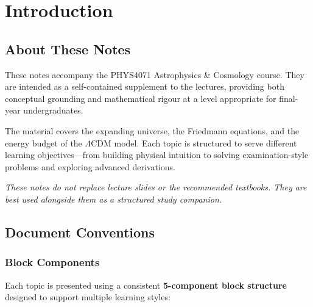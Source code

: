 
\chapter*{Introduction}


\section*{About These Notes}

These notes accompany the PHYS4071 Astrophysics \& Cosmology course.
They are intended as a self-contained supplement to the lectures,
providing both conceptual grounding and mathematical rigour at a level
appropriate for final-year undergraduates.

\medskip\noindent
The material covers the expanding universe, the Friedmann equations, and the
energy budget of the $\Lambda$CDM model.
Each topic is structured to serve different learning objectives---from building
physical intuition to solving examination-style problems and exploring
advanced derivations.

\medskip\noindent
\textit{These notes do not replace lecture slides or the recommended textbooks.
They are best used alongside them as a structured study companion.}

\section*{Document Conventions}

\subsection*{Block Components}

Each topic is presented using a consistent
\textbf{5-component block structure} designed to support multiple learning styles:

\bigskip

